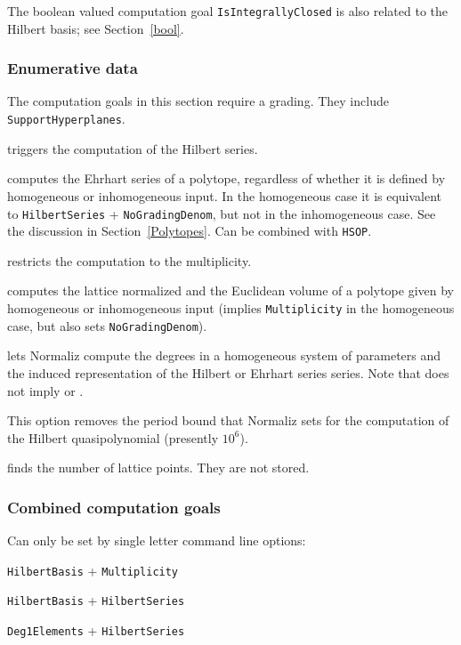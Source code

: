 The boolean valued computation goal \verb|IsIntegrallyClosed| is also related to the Hilbert basis; see Section~\ref{bool}.

\subsubsection{Enumerative data}

The computation goals in this section require a grading. They include \verb|SupportHyperplanes|.

\begin{itemize}
	\itemtt [HilbertSeries,-q] triggers the computation of the Hilbert series.
	
	\itemtt[EhrhartSeries] computes the Ehrhart series of a polytope, regardless of whether it is defined by homogeneous or inhomogeneous input. In the homogeneous case it is equivalent to \verb|HilbertSeries| + \verb|NoGradingDenom|, but not in the inhomogeneous case. See the discussion in Section~\ref{Polytopes}. Can be combined with \verb|HSOP|.
	
	\itemtt[Multiplicity, -v] restricts the computation to the multiplicity.
	
	\itemtt[Volume, -V] computes the lattice normalized and the Euclidean volume of a polytope given by homogeneous or inhomogeneous input (implies \verb|Multiplicity| in the homogeneous case, but also sets \verb|NoGradingDenom|).
	
	\itemtt[HSOP] lets Normaliz compute the degrees in a homogeneous system of parameters and the induced representation of the Hilbert or Ehrhart series series. Note that  does not imply  or .
	
	\itemtt[NoPeriodBound] This option removes the period bound that Normaliz sets for the computation of the Hilbert quasipolynomial (presently $10^6$).
	
	\itemtt[NumberLatticePoints] finds the number of lattice points. They are not stored.
\end{itemize}

\subsubsection{Combined computation goals}

Can only be set by single letter command line options:

\begin{itemize}
	\itemtt[-n] \verb|HilbertBasis| + \verb|Multiplicity|
	
	\itemtt[-h] \verb|HilbertBasis| + \verb|HilbertSeries|
	
	\itemtt[-p] \verb|Deg1Elements| + \verb|HilbertSeries|
	
\end{itemize}


